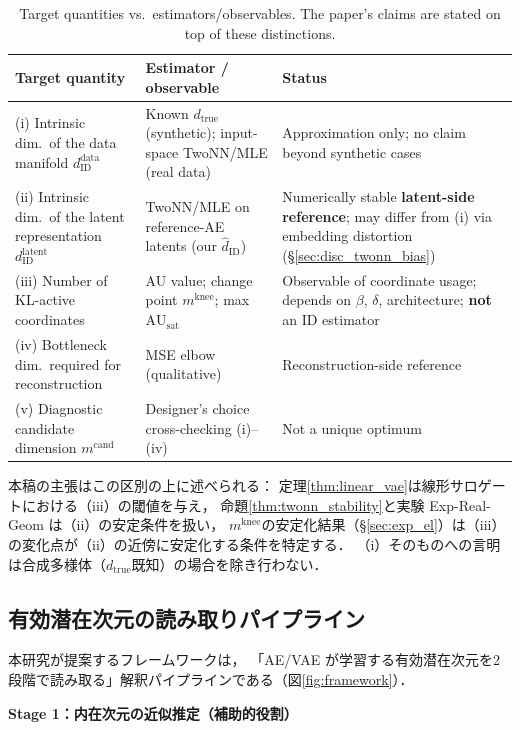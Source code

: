 \documentclass[11pt,a4paper]{jsarticle}
\newcommand{\dzopt}{m^{\mathrm{cand}}}
\newcommand{\dtrue}{d_{\mathrm{true}}}
\newcommand{\AUsat}{\mathrm{AU}_{\mathrm{sat}}}
\newcommand{\mknee}{m^{\mathrm{knee}}}
\begin{document}
\begin{table}[H]
\centering
\caption{Target quantities vs.\ estimators/observables. The paper's claims are stated on top of these distinctions.}
\label{tab:target_estimator}
\small
\begin{tabular}{p{4.6cm}p{4.3cm}p{4.8cm}}
\toprule
Target quantity & Estimator / observable & Status \\
\midrule
(i) Intrinsic dim.\ of the data manifold $d_\mathrm{ID}^\mathrm{data}$ & Known $\dtrue$ (synthetic); input-space TwoNN/MLE (real data) & Approximation only; no claim beyond synthetic cases \\
(ii) Intrinsic dim.\ of the latent representation $d_\mathrm{ID}^\mathrm{latent}$ & TwoNN/MLE on reference-AE latents (our $\hat{d}_\mathrm{ID}$) & Numerically stable \textbf{latent-side reference}; may differ from (i) via embedding distortion (§\ref{sec:disc_twonn_bias}) \\
(iii) Number of KL-active coordinates & AU value; change point $\mknee$; max $\AUsat$ & Observable of coordinate usage; depends on $\beta$, $\delta$, architecture; \textbf{not} an ID estimator \\
(iv) Bottleneck dim.\ required for reconstruction & MSE elbow (qualitative) & Reconstruction-side reference \\
(v) Diagnostic candidate dimension $\dzopt$ & Designer's choice cross-checking (i)--(iv) & Not a unique optimum \\
\bottomrule
\end{tabular}
\end{table}

本稿の主張はこの区別の上に述べられる：
定理\ref{thm:linear_vae}は線形サロゲートにおける（iii）の閾値を与え，
命題\ref{thm:twonn_stability}と実験 Exp-Real-Geom は（ii）の安定条件を扱い，
$\mknee$の安定化結果（§\ref{sec:exp_el}）は（iii）の変化点が（ii）の近傍に安定化する条件を特定する．
（i）そのものへの言明は合成多様体（$\dtrue$既知）の場合を除き行わない．

\subsection{有効潜在次元の読み取りパイプライン}\label{sec:framework_pipeline}

本研究が提案するフレームワークは，
「AE/VAE が学習する有効潜在次元を2段階で読み取る」解釈パイプラインである（図\ref{fig:framework}）．

\textbf{Stage 1：内在次元の近似推定（補助的役割）}
\end{document}
